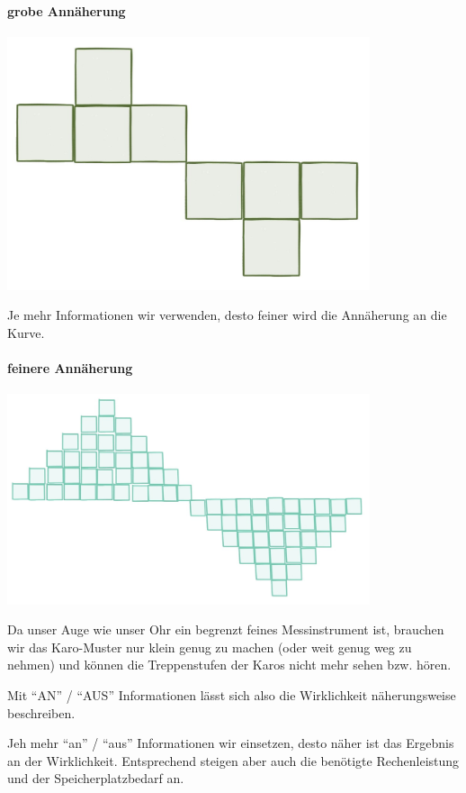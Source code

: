   \begin{frame}
  \framesubtitle{grobe Annäherung}
    \begin{center}
      \includegraphics[width=0.8\textwidth]{pics/grobe-karos}
    \end{center}
  \end{frame}

  Je mehr Informationen wir verwenden, desto feiner wird die Annäherung an die Kurve.

  \begin{frame}
  \framesubtitle{feinere Annäherung}
    \begin{center}  
      \includegraphics[width=0.8\textwidth]{pics/feine-karos}
    \end{center}
  \end{frame}

  Da unser Auge wie unser Ohr ein begrenzt feines Messinstrument ist, brauchen wir das Karo-Muster nur klein genug zu machen (oder weit genug weg zu nehmen) und können die Treppenstufen der Karos nicht mehr sehen bzw. hören.

  Mit ``AN'' / ``AUS'' Informationen lässt sich also die Wirklichkeit näherungsweise beschreiben. 

  \begin{frame}
    Jeh mehr ``an'' / ``aus'' Informationen wir einsetzen, desto näher ist das Ergebnis an der Wirklichkeit. Entsprechend steigen aber auch die benötigte Rechenleistung und der Speicherplatzbedarf an. 
  \end{frame}

